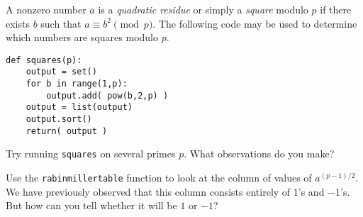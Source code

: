 \documentclass[12pt]{exam}
\begin{document}
\begin{questions}
  \question A nonzero number $a$ is a \emph{quadratic residue} or simply a \emph{square} modulo $p$ if there exists $b$ such that $a\equiv b^2\pmod{p}$. The following code may be used to determine which numbers are squares modulo $p$.
  \begin{lstlisting}
def squares(p):
    output = set()
    for b in range(1,p):
        output.add( pow(b,2,p) )
    output = list(output)
    output.sort()
    return( output )
  \end{lstlisting}
  Try running \texttt{squares} on several primes $p$. What observations do you make?
  \newpage
  \question Use the \texttt{rabinmillertable} function to look at the column of values of $a^{(p-1)/2}$. We have previously observed that this column consists entirely of $1$'s and $-1$'s. But how can you tell whether it will be $1$ or $-1$?
\end{questions}
\end{document}
